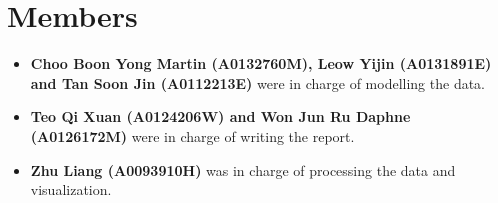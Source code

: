 \documentclass[letterpaper]{article}
\begin{document}
	\section{Members}
	\begin{itemize}
		\item {\bf Choo Boon Yong Martin (A0132760M), Leow Yijin (A0131891E) and Tan Soon Jin (A0112213E)} were in charge of modelling the data.
		\item {\bf Teo Qi Xuan (A0124206W) and Won Jun Ru Daphne (A0126172M)} were in charge of writing the report.
		\item {\bf Zhu Liang (A0093910H)} was in charge of processing the data and visualization.
	\end{itemize}


	\printbibliography
\end{document}
